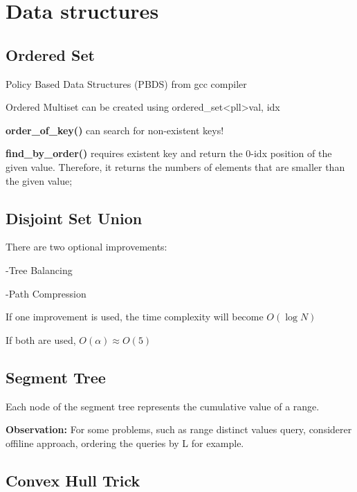 \chapter{Data structures}

\section{Ordered Set}

    Policy Based Data Structures (PBDS) from gcc compiler

    Ordered Multiset can be created using ordered\_set\textless pll\textgreater {val, idx}

    \textbf{order\_of\_key()} can search for non-existent keys!
    
    \textbf{find\_by\_order()} requires existent key and return the 0-idx position of the given value.
    Therefore, it returns the numbers of elements that are smaller than the given value;


\section{Disjoint Set Union}

    There are two optional improvements:

        -Tree Balancing 
        
        -Path Compression

    If one improvement is used, 
    the time complexity will become $O(\log{N})$

    If both are used, $O(\alpha) \approx O(5)$


\section{Segment Tree}

    Each node of the segment tree represents the cumulative value of a range.

    \textbf{Observation:} For some problems, such as range distinct values query,
    considerer offiline approach, ordering the queries by L for example. 


\section{Convex Hull Trick}

